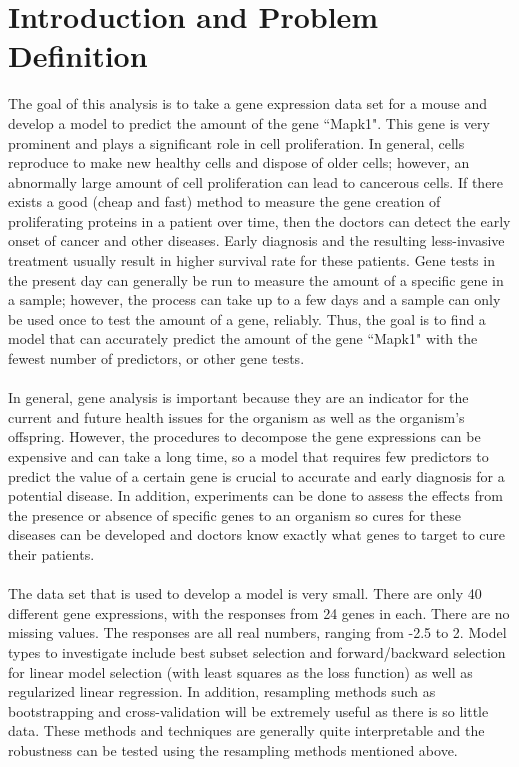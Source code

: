 \documentclass{article}
\begin{document}
\section{Introduction and Problem Definition}
The goal of this analysis is to take a gene expression data set for a mouse and develop a model to predict the amount of the gene ``Mapk1".  This gene is very prominent and plays a significant role in cell proliferation.  In general, cells reproduce to make new healthy cells and dispose of older cells; however, an abnormally large amount of cell proliferation can lead to cancerous cells.  If there exists a good (cheap and fast) method to measure the gene creation of proliferating proteins in a patient over time, then the doctors can detect the early onset of cancer and other diseases.  Early diagnosis and the resulting less-invasive treatment usually result in higher survival rate for these patients.  Gene tests in the present day can generally be run to measure the amount of a specific gene in a sample; however, the process can take up to a few days and a sample can only be used once to test the amount of a gene, reliably.  Thus, the goal is to find a model that can accurately predict the amount of the gene  ``Mapk1" with the fewest number of predictors, or other gene tests.\\
\null\\
%
In general, gene analysis is important because they are an indicator for the current and future health issues for the organism as well as the organism's offspring.  However, the procedures to decompose the gene expressions can be expensive and can take a long time, so a model that requires few predictors to predict the value of a certain gene is crucial to accurate and early diagnosis for a potential disease.  In addition, experiments can be done to assess the effects from the presence or absence of specific genes to an organism so cures for these diseases can be developed and doctors know exactly what genes to target to cure their patients.\\
\null\\
%
The data set that is used to develop a model is very small.  There are only 40 different gene expressions, with the responses from 24 genes
in each.  There are no missing values.  The responses are all real numbers, ranging from -2.5 to 2.  Model types to investigate include best subset selection and forward/backward selection for linear model selection (with least squares as the loss function) as well as regularized linear regression.  In addition, resampling methods such as bootstrapping and cross-validation will be extremely useful as there is so little data.  These methods and techniques are generally quite interpretable and the robustness can be tested using the resampling methods mentioned above.\\
\end{document}
